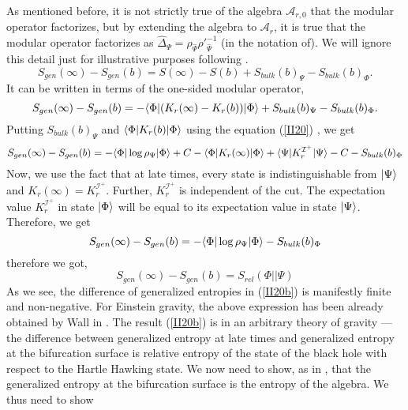 \documentclass[12pt]{article}
\DeclarePairedDelimiter\bra{\langle}{\rvert}
\DeclarePairedDelimiter\ket{\lvert}{\rangle}
\begin{document}
As mentioned before, it is not strictly true of the algebra $\mathcal{A}_{r,0}$ that the modular operator factorizes, but by extending the algebra to $\mathcal{A}_{r}$, it is true that the modular operator factorizes as $\hat \Delta_{\Psi}= \rho_{\hat \Psi}\rho'^{-1}_{\hat \Psi} $ (in the notation of\cite{EW3}). We will ignore this detail just for illustrative purposes following \cite{VGE} .
\begin{equation}\label{II20aa}
S_{gen}(\infty)-S_{gen}(b) = S(\infty) - S(b) + S_{bulk}(b)_{\Psi} - S_{bulk}(b)_{\Phi}.
\end{equation}
It can be written in terms of the one-sided modular operator,
\begin{equation}\label{II20i}
S_{gen}(\infty)-S_{gen}(b) = - \bra{\Phi} (K_{r}(\infty)-K_r(b)) \ket{\Phi} + S_{bulk}(b)_{\Psi} - S_{bulk}(b)_{\Phi}.
\end{equation}
Putting $S_{bulk}(b)_{\Psi}$ and $\bra{\Phi}K_r(b)\ket{\Phi}$ using the equation (\ref{II20}) , we get
\begin{equation}\label{II20ia}
S_{gen}(\infty)-S_{gen}(b) = -\bra{\Phi} \log{\rho_{\Psi}} \ket{\Phi}+ C -\bra{\Phi} K_{r}(\infty)\ket{\Phi} + \bra{\Psi} K_r^{\mathcal{I^+}} \ket{\Psi}-C -S_{bulk}(b)_{\Phi}
\end{equation}
Now, we use the fact that at late times, every state is indistinguishable from $\ket{\Psi}$ and $K_r(\infty)=K_r^{\mathcal{I^+}}$. Further, $K_r^{\mathcal{I^+}}$  is independent of the cut. The expectation value $ K_r^{\mathcal{I^+}}$ in state $\ket{\Phi}$ will be equal to its expectation value in state $\ket{\Psi}$. Therefore, we get
\begin{equation}\label{II20ii}
S_{gen}(\infty)-S_{gen}(b) = - \bra{\Phi}\log{\rho_{\Psi}} \ket{\Phi } - S_{bulk}(b)_{\Phi}
\end{equation}
therefore we got,
\begin{equation}\label{II20b}
S_{gen}(\infty)-S_{gen}(b)=S_{rel}(\Phi||\Psi)
\end{equation}
As we see, the difference of generalized entropies in (\ref{II20b}) is manifestly finite and non-negative.
For Einstein gravity, the above expression has been already obtained by Wall in \cite{AW}. The result (\ref{II20b}) is in an arbitrary theory of gravity --- the difference between generalized entropy at late times and generalized entropy at the bifurcation surface is relative entropy of the state of the black hole with respect to the Hartle Hawking state. We now need to show, as in \cite{VGE}, that the generalized entropy at the bifurcation surface is the entropy of the algebra. We thus need to show
\end{document}
